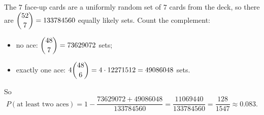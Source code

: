 The $7$ face-up cards are a uniformly random set of $7$ cards from the deck, so there are $\dbinom{52}{7}=133784560$ equally likely sets. Count the complement:
\begin{itemize}
\item no ace: $\dbinom{48}{7}=73629072$ sets;
\item exactly one ace: $4\dbinom{48}{6}=4\cdot12271512=49086048$ sets.
\end{itemize}
So
\[
P(\text{at least two aces})=1-\dfrac{73629072+49086048}{133784560}=\dfrac{11069440}{133784560}=\boxed{\dfrac{128}{1547}}\approx0.083 .
\]
